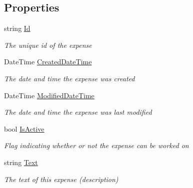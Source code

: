 \subsection*{Properties}
\begin{DoxyCompactItemize}
\item 
string \hyperlink{class_plex_byte_1_1_mo_cap_1_1_interactions_1_1_expense_a2ae20b07c4adccd03406f4546e5bcd07}{Id}
\begin{DoxyCompactList}\small\item\em The unique id of the expense \end{DoxyCompactList}\item 
Date\+Time \hyperlink{class_plex_byte_1_1_mo_cap_1_1_interactions_1_1_expense_a32dd6eeb1125557a6ea5e749257c89e2}{Created\+Date\+Time}
\begin{DoxyCompactList}\small\item\em The date and time the expense was created \end{DoxyCompactList}\item 
Date\+Time \hyperlink{class_plex_byte_1_1_mo_cap_1_1_interactions_1_1_expense_a9c1bd7383b2a3a9cf02c592dce59d172}{Modified\+Date\+Time}
\begin{DoxyCompactList}\small\item\em The date and time the expense was last modified \end{DoxyCompactList}\item 
bool \hyperlink{class_plex_byte_1_1_mo_cap_1_1_interactions_1_1_expense_ac7a86fd8d60af2655c03c5c5412d2d94}{Is\+Active}
\begin{DoxyCompactList}\small\item\em Flag indicating whether or not the expense can be worked on \end{DoxyCompactList}\item 
string \hyperlink{class_plex_byte_1_1_mo_cap_1_1_interactions_1_1_expense_aaaff43e84721b926a37e0a33f8cf40aa}{Text}
\begin{DoxyCompactList}\small\item\em The text of this expense (description) \end{DoxyCompactList}\item 

\end{DoxyCompactItemize}
